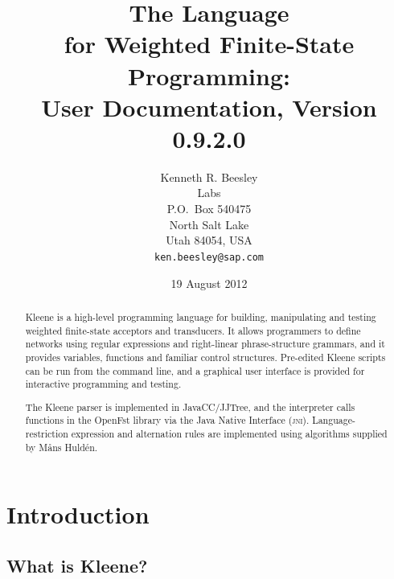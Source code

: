 \documentclass[letterpaper,12pt]{article}
\title{The \Kleene{} Language\\
for Weighted Finite-State Programming:\\
{\Large User Documentation, Version 0.9.2.0}}
\author{Kenneth R. Beesley\\
\acro{sap} Labs\\
P.O.~Box 540475\\
North Salt Lake\\
Utah 84054, USA\\
\texttt{ken.beesley@sap.com}}
\date{19 August 2012}
\newcommand{\Kleene}{Kleene\xspace}
\newcommand{\acro}{\textsc}
\begin{document}

\VerbatimFootnotes

\maketitle





\begin{abstract}
\Kleene{} is a high-level programming language for building,
manipulating and testing weighted 
finite-state acceptors and transducers.
It allows programmers to define networks using regular expressions and
right-linear phrase-structure grammars, and it provides variables, functions and familiar
control structures.  Pre-edited \Kleene{}
scripts can be run from the command line, and a graphical user
interface is provided for interactive programming and testing.

The \Kleene{} parser is implemented in JavaCC/JJTree, and the
interpreter calls functions in the OpenFst library via the Java
Native Interface (\acro{jni}).
Language-restriction expression and alternation rules are implemented using
algorithms supplied by M\r{a}ns Huld\'en. 
\end{abstract}


\newpage
\tableofcontents

\cleardoublepage

\section{Introduction}

\subsection{What is Kleene?}
\end{document}
